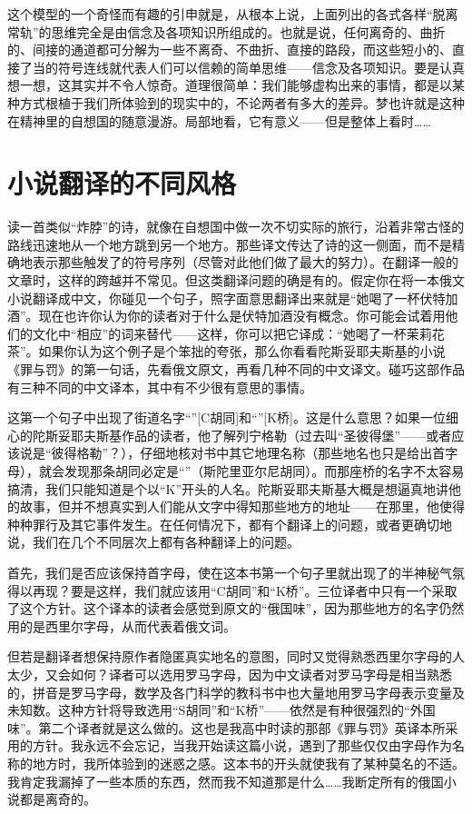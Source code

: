 这个模型的一个奇怪而有趣的引申就是，从根本上说，上面列出的各式各样“脱离常轨”的思维完全是由信念及各项知识所组成的。也就是说，任何离奇的、曲折的、间接的通道都可分解为一些不离奇、不曲折、直接的路段，而这些短小的、直接了当的符号连线就代表人们可以信赖的简单思维——信念及各项知识。要是认真想一想，这其实并不令人惊奇。道理很简单：我们能够虚构出来的事情，都是以某种方式根植于我们所体验到的现实中的，不论两者有多大的差异。梦也许就是这种在精神里的自想国的随意漫游。局部地看，它有意义——但是整体上看时……

\section{小说翻译的不同风格}

读一首类似“炸脖”的诗，就像在自想国中做一次不切实际的旅行，沿着非常古怪的路线迅速地从一个地方跳到另一个地方。那些译文传达了诗的这一侧面，而不是精确地表示那些触发了的符号序列（尽管对此他们做了最大的努力）。在翻译一般的文章时，这样的跨越并不常见。但这类翻译问题的确是有的。假定你在将一本俄文小说翻译成中文，你碰见一个句子，照字面意思翻译出来就是“她喝了一杯伏特加酒”。现在也许你认为你的读者对于什么是伏特加酒没有概念。你可能会试着用他们的文化中“相应”的词来替代——这样，你可以把它译成：“她喝了一杯茉莉花茶”。如果你认为这个例子是个笨拙的夸张，那么你看看陀斯妥耶夫斯基的小说《罪与罚》的第一句话，先看俄文原文，再看几种不同的中文译文。碰巧这部作品有三种不同的中文译本，其中有不少很有意思的事情。

这第一个句子中出现了街道名字“”[C胡同]和“”[K桥]。这是什么意思？如果一位细心的陀斯妥耶夫斯基作品的读者，他了解列宁格勒（过去叫“圣彼得堡”——或者应该说是“彼得格勒”？），仔细地核对书中其它地理名称（那些地名也只是给出首字母），就会发现那条胡同必定是“”（斯陀里亚尔尼胡同）。而那座桥的名字不太容易搞清，我们只能知道是个以“K”开头的人名。陀斯妥耶夫斯基大概是想逼真地讲他的故事，但并不想真实到人们能从文字中得知那些地方的地址——在那里，他使得种种罪行及其它事件发生。在任何情况下，都有个翻译上的问题，或者更确切地说，我们在几个不同层次上都有各种翻译上的问题。

首先，我们是否应该保持首字母，使在这本书第一个句子里就出现了的半神秘气氛得以再现？要是这样，我们就应该用“C胡同”和“K桥”。三位译者中只有一个采取了这个方针。这个译本的读者会感觉到原文的“俄国味”，因为那些地方的名字仍然用的是西里尔字母，从而代表着俄文词。

但若是翻译者想保持原作者隐匿真实地名的意图，同时又觉得熟悉西里尔字母的人太少，又会如何？译者可以选用罗马字母，因为中文读者对罗马字母是相当熟悉的，拼音是罗马字母，数学及各门科学的教科书中也大量地用罗马字母表示变量及未知数。这种方针将导致选用“S胡同”和“K桥”——依然是有种很强烈的“外国味”。第二个译者就是这么做的。这也是我高中时读的那部《罪与罚》英译本所采用的方针。我永远不会忘记，当我开始读这篇小说，遇到了那些仅仅由字母作为名称的地方时，我所体验到的迷惑之感。这本书的开头就使我有了某种莫名的不适。我肯定我漏掉了一些本质的东西，然而我不知道那是什么……我断定所有的俄国小说都是离奇的。

